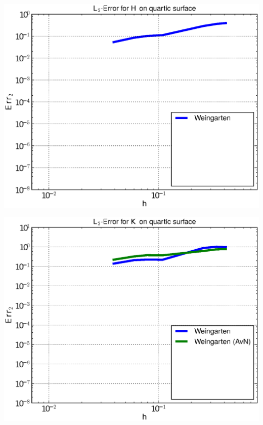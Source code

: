 \documentclass[handout]{beamer}
\begin{document}
\begin{frame}
\begin{overprint}
\begin{minipage}[t]{0.49\textwidth}
            \centering\includegraphics[width=\textwidth]{bilder/Curvature/heineB/ErrHL2_1.eps}
          \end{minipage}
          \begin{minipage}[t]{0.49\textwidth}
            \centering\includegraphics[width=\textwidth]{bilder/Curvature/heineB/ErrKL2_2.eps}
          \end{minipage}\hfill
          \begin{minipage}[t]{0.49\textwidth}

\end{minipage}
\end{overprint}
\end{frame}
\end{document}

